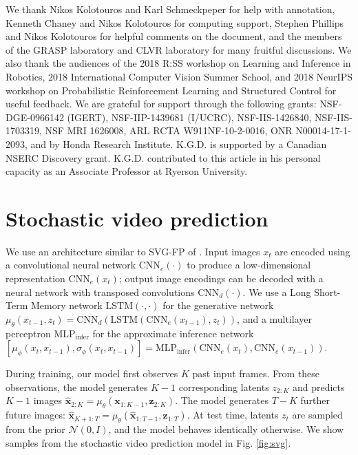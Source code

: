 \documentclass{article} %
\begin{document}
We thank Nikos Kolotouros and Karl Schmeckpeper for help with annotation, Kenneth Chaney and Nikos Kolotouros for computing support, Stephen Phillips and Nikos Kolotouros for helpful comments on the document, and the members of the GRASP laboratory and CLVR laboratory for many fruitful discussions. We also thank the audiences of the 2018 R:SS workshop on Learning and Inference in Robotics, 2018 International Computer Vision Summer School, and 2018 NeurIPS workshop on Probabilistic Reinforcement Learning and Structured Control for useful feedback.  We are grateful for support through the following grants: NSF-DGE-0966142 (IGERT), NSF-IIP-1439681 (I/UCRC), NSF-IIS-1426840, NSF-IIS-1703319, NSF MRI 1626008, ARL RCTA W911NF-10-2-0016, ONR N00014-17-1-2093, and by Honda Research Institute. K.G.D. is supported by a Canadian NSERC Discovery grant. K.G.D. contributed to this article in his personal capacity as an Associate Professor at Ryerson University.

 \clearpage



\appendix

\section{Stochastic video prediction}\label{app:svp}

We use an architecture similar to SVG-FP of \cite{denton18stochastic}. Input images \(x_t\) are encoded using a convolutional neural network 
$\text{CNN}_e(\cdot)$%
to produce a low-dimensional representation $\text{CNN}_e(x_t)$; output image encodings can be decoded with a neural network with transposed convolutions 
$\text{CNN}_d(\cdot)$. We use a Long Short-Term Memory network $\text{LSTM}(\cdot,\cdot)$ for the generative network \(\mu_\theta(x_{t-1},z_t)=\text{CNN}_d(\text{LSTM}(\text{CNN}_e(x_{t-1}),z_t))\), and a multilayer perceptron $\text{MLP}_\text{infer}$ for the approximate inference network \([\mu_\phi(x_t, x_{t-1}),\sigma_\phi(x_t, x_{t-1})] = \text{MLP}_\text{infer}(\text{CNN}_e(x_t),\text{CNN}_e(x_{t-1}))\).  

During training, our model first observes \(K\) past input frames. From these observations, the model generates \(K-1\) corresponding latents \(z_{2:K}\) and predicts \(K-1\) images \(\hat{\mathbf{x}}_{2:K} = \mu_\theta(\mathbf{x}_{1:K-1}, \mathbf{z}_{2:K})\). The model generates $T-K$ further future images: \(\hat{\mathbf{x}}_{K+1:T} = \mu_\theta(\hat{\mathbf{x}}_{1:T-1}, \mathbf{z}_{1:T})\). At test time, latents \(z_t\) are sampled from the prior \(\mathcal{N}(0,I)\), and the model behaves identically otherwise. 
We show samples from the stochastic video prediction model in Fig. \ref{fig:svg}.
\end{document}
